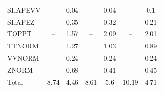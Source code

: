 \begin{table}[H]
\begin{center}
\begin{footnotesize}
\begin{tabular}{lcccccc}
				SHAPEVV & -- &  0.04 & -- &  0.04 & -- &  0.1 \\
				SHAPEZ & -- &  0.35 & -- &  0.32 & -- &  0.21 \\
				TOPPT & -- &  1.57 & -- &  2.09 & -- &  2.01 \\
				TTNORM & -- &  1.27 & -- &  1.03 & -- &  0.89 \\
				VVNORM & -- &  0.24 & -- &  0.24 & -- &  0.24 \\
				ZNORM & -- &  0.68 & -- &  0.41 & -- &  0.45 \\
				Total &  8.74  &  4.46 &  8.61  &  5.6 &  10.19  &  4.71 \\ \hline \hline
			\end{tabular}
			\label{tab:SysUncertainties_600}
        \end{footnotesize}
	\end{center}
\end{table}


